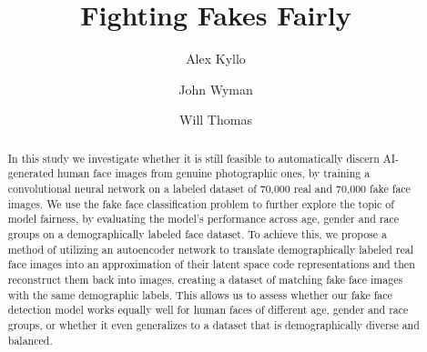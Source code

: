 \documentclass[11pt, letterpaper]{article}
\title{Fighting Fakes Fairly}
\author{
  Alex Kyllo
  \and
  John Wyman
  \and
  Will Thomas
}
\begin{document}
\maketitle

\begin{abstract}
  In this study we investigate whether it is still feasible to automatically
  discern AI-generated human face images from genuine photographic ones, by
  training a convolutional neural network on a labeled dataset of 70,000 real
  and 70,000 fake face images. We use the fake face classification problem to
  further explore the topic of model fairness, by evaluating the model's
  performance across age, gender and race groups on a demographically labeled
  face dataset. To achieve this, we propose a method of utilizing an autoencoder
  network to translate demographically labeled real face images into an
  approximation of their latent space code representations and then reconstruct
  them back into images, creating a dataset of matching fake face images with
  the same demographic labels. This allows us to assess whether our fake face
  detection model works equally well for human faces of different age, gender
  and race groups, or whether it even generalizes to a dataset that is
  demographically diverse and balanced.
\end{abstract}
\end{document}
